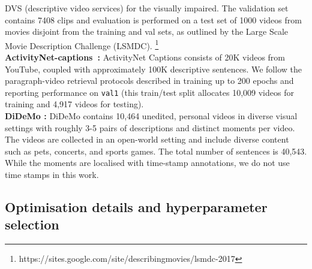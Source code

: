 \documentclass{bmvc2k}
\begin{document}
DVS (descriptive video services) for the visually impaired.  The validation set contains 7408 clips and evaluation is performed on a test set of 1000 videos from movies disjoint from the training and val sets, as outlined by the Large Scale Movie Description
Challenge (LSMDC). \footnote{https://sites.google.com/site/describingmovies/lsmdc-2017} \\
\textbf{ActivityNet-captions~\cite{krishna2017dense}:}  ActivityNet Captions consists of 20K videos from YouTube, coupled with approximately 100K descriptive sentences. We follow the paragraph-video retrieval protocols described in \cite{zhang2018cross} training up to 200 epochs and reporting performance on  \texttt{val1} (this train/test split allocates 10,009 videos for training and 4,917 videos for testing). \\
\textbf{DiDeMo \cite{anne2017localizing}:} DiDeMo contains 10,464 unedited, personal videos in diverse visual settings with roughly 3-5 pairs of descriptions and distinct moments per video. The videos are collected in an open-world setting and include diverse content such as pets, concerts, and sports games. The total number of sentences is 40,543. While the moments are localised with time-stamp annotations, we do not use time stamps in this work. \\


\subsection{Optimisation details and hyperparameter selection}
\end{document}
